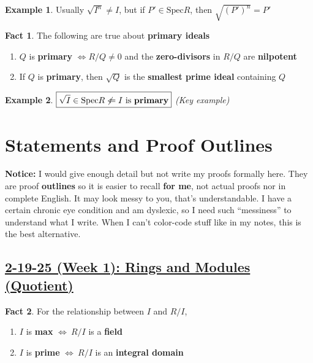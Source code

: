 \documentclass[12pt,a4paper]{article}
\theoremstyle{definition}
\newtheorem{fact}{Fact}
\newtheorem{example}{Example}
\begin{document}
\begin{example}
  Usually $\sqrt{I^n} \neq I$, but if \underline{$P' \in \text{Spec}R$}, then $\boxed{\sqrt{(P')^n} = P'}$
\end{example}
\vspace{0.125em}

\begin{fact}
  The following are true about \textbf{primary ideals}
  \begin{enumerate} [(1)]
    \item $Q$ is \textbf{primary} $\Leftrightarrow R/Q \neq 0$ and the \textbf{zero-divisors} in $R/Q$ are \textbf{nilpotent}
    \item If $Q$ is \textbf{primary}, then $\sqrt{Q}$ is the \textbf{smallest prime ideal} containing $Q$
  \end{enumerate}
\end{fact}
\vspace{0.125em}

\begin{example}
  $\boxed{\sqrt{I} \in \text{Spec}R \not\Leftarrow I \text{ is \textbf{primary}}}$ \textit{(Key example)}
\end{example}
\vspace{0.125em}
\newpage

\section*{Statements and Proof Outlines}
\begin{mdframed}
\textbf{Notice:} I would give enough detail but not write my proofs formally here. They are proof \textbf{outlines} so it is easier to recall \textbf{for me}, not actual proofs nor in complete English. It may look messy to you, that's understandable. I have a certain chronic eye condition and am dyslexic, so I need such ``messiness'' to understand what I write. When I can't color-code stuff like in  my notes, this is the best alternative.
\end{mdframed}

\setcounter{subsection}{1}
\setcounter{theorem}{0}
\setcounter{lemma}{0}
\setcounter{proposition}{0}
\setcounter{corollary}{0}
\setcounter{fact}{0}
\setcounter{claim}{0}
\setcounter{example}{0}
\subsection*{\underline{\textbf{2-19-25 (Week 1): Rings and Modules (Quotient)}}}
\begin{fact}
  For the relationship between $I$ and $R/I$,
  \begin{enumerate} [(1)]
    \item $I$ is \textbf{max} $\Leftrightarrow \ R/I$ is a \textbf{field}
    \item $I$ is \textbf{prime} $\Leftrightarrow \ R/I$ is an \textbf{integral domain}
  \end{enumerate}
\end{fact}
\end{document}
